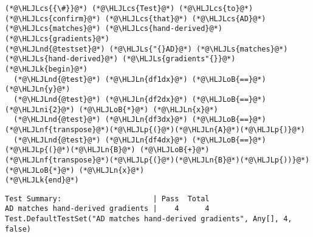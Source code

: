 \documentclass[12pt,a4paper]{article}
\newcommand{\HLJLk}[1]{\textcolor[RGB]{148,91,176}{\textbf{#1}}}
\newcommand{\HLJLn}[1]{#1}
\newcommand{\HLJLnd}[1]{\textcolor[RGB]{214,102,97}{#1}}
\newcommand{\HLJLnf}[1]{\textcolor[RGB]{66,102,213}{#1}}
\newcommand{\HLJLs}[1]{\textcolor[RGB]{201,61,57}{#1}}
\newcommand{\HLJLni}[1]{\textcolor[RGB]{59,151,46}{#1}}
\newcommand{\HLJLoB}[1]{\textcolor[RGB]{102,102,102}{\textbf{#1}}}
\newcommand{\HLJLp}[1]{#1}
\newcommand{\HLJLcs}[1]{\textcolor[RGB]{153,153,119}{\textit{#1}}}
\begin{document}
\begin{lstlisting}
(*@\HLJLcs{{\#}}@*) (*@\HLJLcs{Test}@*) (*@\HLJLcs{to}@*) (*@\HLJLcs{confirm}@*) (*@\HLJLcs{that}@*) (*@\HLJLcs{AD}@*) (*@\HLJLcs{matches}@*) (*@\HLJLcs{hand-derived}@*) (*@\HLJLcs{gradients}@*)
(*@\HLJLnd{@testset}@*) (*@\HLJLs{"{}AD}@*) (*@\HLJLs{matches}@*) (*@\HLJLs{hand-derived}@*) (*@\HLJLs{gradients"{}}@*) (*@\HLJLk{begin}@*)
  (*@\HLJLnd{@test}@*) (*@\HLJLn{df1dx}@*) (*@\HLJLoB{==}@*) (*@\HLJLn{y}@*)
  (*@\HLJLnd{@test}@*) (*@\HLJLn{df2dx}@*) (*@\HLJLoB{==}@*) (*@\HLJLni{2}@*) (*@\HLJLoB{*}@*) (*@\HLJLn{x}@*)
  (*@\HLJLnd{@test}@*) (*@\HLJLn{df3dx}@*) (*@\HLJLoB{==}@*) (*@\HLJLnf{transpose}@*)(*@\HLJLp{(}@*)(*@\HLJLn{A}@*)(*@\HLJLp{)}@*)
  (*@\HLJLnd{@test}@*) (*@\HLJLn{df4dx}@*) (*@\HLJLoB{==}@*) (*@\HLJLp{(}@*)(*@\HLJLn{B}@*) (*@\HLJLoB{+}@*) (*@\HLJLnf{transpose}@*)(*@\HLJLp{(}@*)(*@\HLJLn{B}@*)(*@\HLJLp{))}@*) (*@\HLJLoB{*}@*) (*@\HLJLn{x}@*)
(*@\HLJLk{end}@*)
\end{lstlisting}

\begin{lstlisting}
Test Summary:                     | Pass  Total
AD matches hand-derived gradients |    4      4
Test.DefaultTestSet("AD matches hand-derived gradients", Any[], 4, false)
\end{lstlisting}
\end{document}
